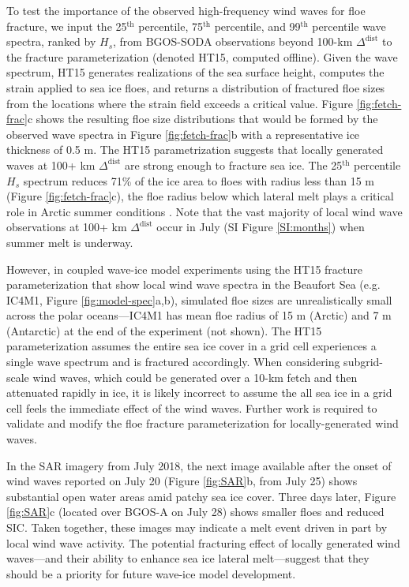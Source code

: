 \documentclass [11pt, proquest] {uwthesis}[2020/02/24]
\begin{document}
To test the importance of the observed high-frequency wind waves for floe fracture, we input the 25$^\mathrm{th}$ percentile, 75$^\mathrm{th}$ percentile, and 99$^\mathrm{th}$ percentile wave spectra, ranked by \(H_s\), from BGOS-SODA observations beyond 100-km $\Delta^{\mathrm{dist}}$ to the \cite{Horvat2015} fracture parameterization (denoted HT15, computed offline). Given the wave spectrum, HT15 generates realizations of the sea surface height, computes the strain applied to sea ice floes, and returns a distribution of fractured floe sizes from the locations where the strain field exceeds a critical value. Figure \ref{fig:fetch-frac}c shows the resulting floe size distributions that would be formed by the observed wave spectra in Figure \ref{fig:fetch-frac}b with a representative ice thickness of 0.5 m. The HT15 parametrization suggests that locally generated waves at 100+ km $\Delta^{\mathrm{dist}}$ are strong enough to fracture sea ice. The 25$^\mathrm{th}$ percentile $H_s$ spectrum reduces 71\% of the ice area to floes with radius less than 15 m (Figure \ref{fig:fetch-frac}c), the floe radius below which lateral melt plays a critical role in Arctic summer conditions \cite{Steele1992SeaModel}. Note that the vast majority of local wind wave observations at 100+ km $\Delta^{\mathrm{dist}}$ occur in July (SI Figure \ref{SI:months}) when summer melt is underway.  

However, in coupled wave-ice model experiments using the HT15 fracture parameterization that show local wind wave spectra in the Beaufort Sea (e.g. IC4M1, Figure \ref{fig:model-spec}a,b), simulated floe sizes are unrealistically small across the polar oceans---IC4M1 has mean floe radius of 15 m (Arctic) and 7 m (Antarctic) at the end of the experiment (not shown). The HT15 parameterization assumes the entire sea ice cover in a grid cell experiences a single wave spectrum and is fractured accordingly. When considering subgrid-scale wind waves, which could be generated over a 10-km fetch and then attenuated rapidly in ice, it is likely incorrect to assume the all sea ice in a grid cell feels the immediate effect of the wind waves. Further work is required to validate and modify the floe fracture parameterization for locally-generated wind waves.  

In the SAR imagery from July 2018, the next image available after the onset of wind waves reported on July 20 (Figure \ref{fig:SAR}b, from July 25) shows substantial open water areas amid patchy sea ice cover. Three days later, Figure \ref{fig:SAR}c (located over BGOS-A on July 28) shows smaller floes and reduced SIC. Taken together, these images may indicate a melt event driven in part by local wind wave activity. The potential fracturing effect of locally generated wind waves---and their ability to enhance sea ice lateral melt---suggest that they should be a priority for future wave-ice model development.  
\end{document}
